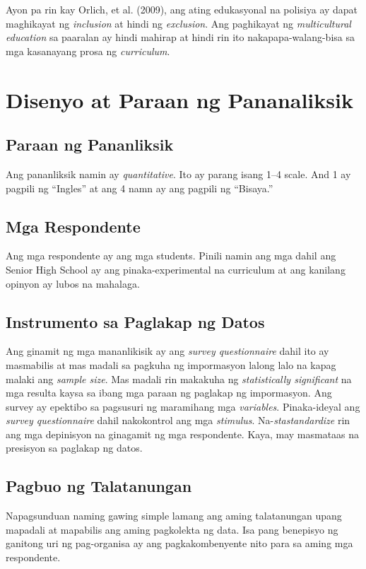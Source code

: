 \documentclass [11pt] {report}
\begin{document}
Ayon pa rin kay Orlich, et al. (2009), ang ating edukasyonal na polisiya ay
dapat maghikayat ng \emph{inclusion} at hindi ng \emph{exclusion}. Ang
paghikayat ng \emph{multicultural education} sa paaralan ay hindi mahirap at
hindi rin ito nakapapa-walang-bisa sa mga kasanayang prosa ng \emph{curriculum}.

\chapter{Disenyo at Paraan ng Pananaliksik}
\section{Paraan ng Pananliksik}
Ang pananliksik namin ay \emph{quantitative}. Ito ay parang isang 1--4 scale.
And 1 ay pagpili ng ``Ingles'' at ang 4 namn ay ang pagpili ng ``Bisaya.''
\section{Mga Respondente}
Ang mga respondente ay ang mga \glspl{student}. Pinili namin ang mga
 dahil ang Senior High School ay ang  pinaka-experimental na
curriculum at ang kanilang opinyon ay lubos na mahalaga.
\section{Instrumento sa Paglakap ng Datos}
Ang ginamit ng mga mananlikisik ay ang \emph{survey questionnaire} dahil ito ay
masmabilis at mas madali sa pagkuha ng impormasyon lalong lalo na kapag malaki
ang \emph{sample size}. Mas madali rin makakuha ng \emph{statistically
  significant} na mga resulta kaysa sa ibang mga paraan ng paglakap ng
impormasyon. Ang survey ay epektibo sa pagsusuri ng maramihang mga
\emph{variables}. Pinaka-ideyal ang \emph{survey questionnaire } dahil
nakokontrol ang mga \emph{stimulus}. Na-\emph{stastandardize} rin ang mga
depinisyon na ginagamit ng mga respondente. Kaya, may masmataas na presisyon sa
paglakap ng datos.

\section{Pagbuo ng Talatanungan}
Napagsunduan naming gawing simple lamang ang aming talatanungan upang mapadali
at mapabilis ang aming pagkolekta ng data. Isa pang benepisyo ng ganitong uri ng
pag-organisa ay ang pagkakombenyente nito para sa aming mga respondente.
\end{document}
